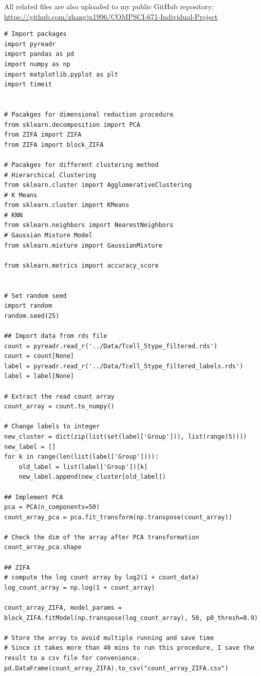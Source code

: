 \documentclass[12pt]{article}
\theoremstyle{definition}
\begin{document}
All related files are also uploaded to my public GitHub repository:
~\\
\url{https://github.com/zhangjx1996/COMPSCI-671-Individual-Project}
~\\

\begin{lstlisting}
# Import packages
import pyreadr
import pandas as pd
import numpy as np
import matplotlib.pyplot as plt
import timeit


# Pacakges for dimensional reduction procedure
from sklearn.decomposition import PCA
from ZIFA import ZIFA
from ZIFA import block_ZIFA

# Pacakges for different clustering method
# Hierarchical Clustering
from sklearn.cluster import AgglomerativeClustering
# K Means
from sklearn.cluster import KMeans
# KNN
from sklearn.neighbors import NearestNeighbors
# Gaussian Mixture Model
from sklearn.mixture import GaussianMixture

from sklearn.metrics import accuracy_score


# Set random seed
import random
random.seed(25)

## Import data from rds file
count = pyreadr.read_r('../Data/Tcell_5type_filtered.rds')
count = count[None]
label = pyreadr.read_r('../Data/Tcell_5type_filtered_labels.rds')
label = label[None]

# Extract the read count array
count_array = count.to_numpy()

# Change labels to integer
new_cluster = dict(zip(list(set(label['Group'])), list(range(5))))
new_label = []
for k in range(len(list(label['Group']))):
    old_label = list(label['Group'])[k]
    new_label.append(new_cluster[old_label])
    
## Implement PCA
pca = PCA(n_components=50)
count_array_pca = pca.fit_transform(np.transpose(count_array))

# Check the dim of the array after PCA transformation
count_array_pca.shape

## ZIFA
# compute the log count array by log2(1 + count_data)
log_count_array = np.log(1 + count_array)

count_array_ZIFA, model_params = block_ZIFA.fitModel(np.transpose(log_count_array), 50, p0_thresh=0.9)

# Store the array to avoid multiple running and save time
# Since it takes more than 40 mins to run this procedure, I save the result to a csv file for convenience.
pd.DataFrame(count_array_ZIFA).to_csv("count_array_ZIFA.csv")


\end{lstlisting}
\end{document}
